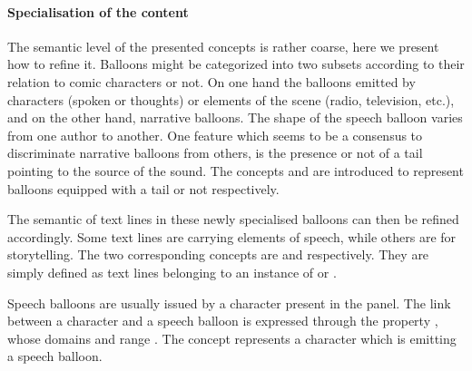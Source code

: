 
\paragraph{Specialisation of the content} %
\label{par:specialisation_of_the_content}

The semantic level of the presented concepts is rather coarse, here we present how to refine it.
Balloons might be categorized into two subsets according to their relation to comic characters or not.
On one hand the balloons emitted by characters (spoken or thoughts) or elements of the scene (radio, television, etc.), and on the other hand, narrative balloons.
The shape of the speech balloon varies from one author to another.
One feature which seems to be a consensus to discriminate narrative balloons from others, is the presence or not of a tail pointing to the source of the sound.
The concepts  and  are introduced to represent balloons equipped with a tail or not respectively.

The semantic of text lines in these newly specialised balloons can then be refined accordingly.
Some text lines are carrying elements of speech, while others are for storytelling.
The two corresponding concepts are  and  respectively.
They are simply defined as text lines belonging to an instance of  or .

Speech balloons are usually issued by a character present in the panel.
The link between a character and a speech balloon is expressed through the property , whose domains  and range .
The concept  represents a character which is emitting a speech balloon.


